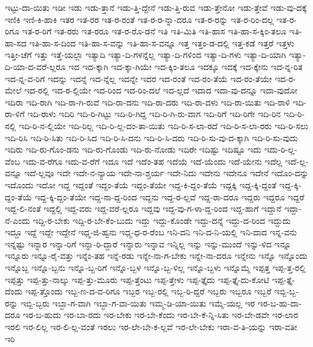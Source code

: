 {ಇಟ್ಟು-ದಾ-ಯಿತು
ಇಡೀ
ಇಡು
ಇಡು-ತ್ತಾನೆ
ಇಡು-ತ್ತಿ-ದ್ದೇನೆ
ಇಡು-ತ್ತಿ-ರುವ
ಇಡು-ತ್ತೇನೋ
ಇಡು-ತ್ತೇವೆ
ಇಡು-ವು-ದಕ್ಕೆ
ಇಣಿಕಿ
ಇಣಿ-ಕಿ-ಹಾಕಿ
ಇತರ
ಇತ-ರರ
ಇತ-ರ-ರಂತೆ
ಇತ-ರ-ರ-ನ್ನಾ-ದರೂ
ಇತ-ರ-ರನ್ನು
ಇತ-ರ-ರಿಂ-ದಲ್ಲ
ಇತ-ರ-ರಿಗೂ
ಇತ-ರ-ರಿಗೆ
ಇತ-ರರು
ಇತ-ರರೂ
ಇತ-ರ-ರೊ-ಡನೆ
ಇತಿ
ಇತಿ-ಮಿತಿ
ಇತಿ-ಹಾಸ
ಇತಿ-ಹಾ-ಸ-ಕ್ಕಿಂ-ತಲೂ
ಇತಿ-ಹಾ-ಸದ
ಇತಿ-ಹಾ-ಸ-ದಿಂದ
ಇತಿ-ಹಾ-ಸ-ವನ್ನು
ಇತಿ-ಹಾ-ಸ-ವನ್ನೂ
ಇತ್ತ
ಇತ್ತಂ-ಡ-ದಲ್ಲಿ
ಇತ್ತ-ಕಡೆ
ಇತ್ತರೆ
ಇತ್ತಳು
ಇತ್ತೀ-ಚೆಗೆ
ಇತ್ತು
ಇತ್ತೆ-ಯಲ್ಲಾ
ಇತ್ಯಾದಿ
ಇತ್ಯಾ-ದಿ-ಗಳನ್ನೆಲ್ಲ
ಇತ್ಯಾ-ದಿ-ಗಳಿಂದ
ಇತ್ಯಾ-ದಿ-ಗಳು
ಇತ್ಯಾ-ದಿ-ಯಾಗಿ
ಇತ್ಯಾ-ದಿ-ಯಾ-ದ-ವರೆ-ಲ್ಲರೂ
ಇದ
ಇದ-ಕ್ಕಾಗಿ
ಇದ-ಕ್ಕಾ-ಗಿಯೇ
ಇದ-ಕ್ಕಿಂ-ತಲೂ
ಇದಕ್ಕೂ
ಇದಕ್ಕೆ
ಇದ-ಕ್ಕೇನು
ಇದ-ನ್ನ-ರಿತ
ಇದ-ನ್ನ-ವ-ರಿಗೆ
ಇದನ್ನು
ಇದನ್ನೆ
ಇದ-ನ್ನೆಲ್ಲ
ಇದನ್ನೇ
ಇದರ
ಇದ-ರಂತೆ
ಇದ-ರಂ-ತೆಯೆ
ಇದ-ರಂ-ತೆಯೇ
ಇದ-ರ-ಮೇಲೆ
ಇದ-ರಲ್ಲಿ
ಇದ-ರ-ಲ್ಲಿಯೇ
ಇದ-ರಿಂದ
ಇದ-ರಿಂ-ದಲೆ
ಇದ-ಲ್ಲದೆ
ಇದಾದ
ಇದಾ-ವು-ದನ್ನೂ
ಇದಾ-ವುದೋ
ಇದಿರಾ
ಇದಿ-ರಾಗಿ
ಇದಿ-ರಾ-ಗಿ-ರುವೆ
ಇದಿ-ರಾ-ದನು
ಇದಿ-ರಾ-ದರು
ಇದಿ-ರಾ-ದಳು
ಇದಿ-ರಾ-ಯಿತು
ಇದಿ-ರಾಳಿ
ಇದಿ-ರಾ-ಳಿಗೆ
ಇದಿ-ರಾಳು
ಇದಿರಿ
ಇದಿ-ರಿ-ಗಿಟ್ಟು
ಇದಿ-ರಿ-ಗಿದ್ದ
ಇದಿ-ರಿ-ಗಿ-ರು-ವಾಗ
ಇದಿ-ರಿಗೆ
ಇದಿ-ರಿಗೇ
ಇದಿ-ರಿನ
ಇದಿ-ರಿ-ನಲ್ಲಿ
ಇದಿ-ರಿ-ನ-ಲ್ಲಿಯೇ
ಇದಿ-ರಿಲ್ಲ
ಇದಿ-ರಿ-ಲ್ಲ-ದಂ-ತಾ-ಯಿತು
ಇದಿ-ರಿ-ಸ-ಲಾ-ರದೆ
ಇದಿ-ರಿ-ಸ-ಲಾ-ರರು
ಇದಿ-ರಿ-ಸಲು
ಇದಿ-ರಿಸಿ
ಇದಿ-ರಿ-ಸಿತು
ಇದಿ-ರಿ-ಸಿದ
ಇದಿ-ರಿ-ಸಿ-ದನು
ಇದಿ-ರಿ-ಸಿ-ದರು
ಇದಿ-ರಿ-ಸು-ವು-ದ-ಕ್ಕಾಗಿ
ಇದಿ-ರಿ-ಸು-ವುದು
ಇದಿರು
ಇದಿ-ರು-ಗೊಂ-ಡನು
ಇದಿ-ರು-ಗೊಂಡು
ಇದಿ-ರು-ನೋಡು
ಇದಿರೇ
ಇದಿಷ್ಟು
ಇದಿಷ್ಟೂ
ಇದು
ಇದು-ರಿ-ಲ್ಲ-ವೆಂಬ
ಇದು-ವ-ರೆಗೂ
ಇದು-ವ-ರೆಗೆ
ಇದೂ
ಇದೆ
ಇದೆಂ-ತಹ
ಇದೆಯೆ
ಇದೆ-ಯೆಂದು
ಇದೆ-ಯೇನು
ಇದೆಲ್ಲ
ಇದೆ-ಲ್ಲ-ವನ್ನೂ
ಇದೆ-ಲ್ಲವೂ
ಇದೇ
ಇದೇ-ನ-ನ್ಯಾಯ
ಇದೇ-ನಾ-ಶ್ಚರ್ಯ
ಇದೇ-ನಿದು
ಇದೇನು
ಇದೇನೂ
ಇದೇನೆ
ಇದೊಂ-ದನ್ನು
ಇದೊಂದು
ಇದೋ
ಇದ್ದ
ಇದ್ದಂತೆ
ಇದ್ದಂ-ತೆಯೆ
ಇದ್ದಂ-ತೆಯೇ
ಇದ್ದ-ಕಿ-ದ್ದಂ-ತೆಯೆ
ಇದ್ದಕ್ಕಿ
ಇದ್ದ-ಕ್ಕಿ-ದ್ದಂತೆ
ಇದ್ದ-ಕ್ಕಿ-ದ್ದಂ-ತೆಯೆ
ಇದ್ದ-ಕ್ಕಿ-ದ್ದಂ-ತೆಯೇ
ಇದ್ದ-ನಾ-ದ್ದ-ರಿಂದ
ಇದ್ದನು
ಇದ್ದ-ರ-ಲ್ಲವೆ
ಇದ್ದ-ರಾ-ದರೂ
ಇದ್ದರು
ಇದ್ದರೂ
ಇದ್ದರೆ
ಇದ್ದ-ಲಿ-ನಂತೆ
ಇದ್ದಲ್ಲಿ
ಇದ್ದ-ವರು
ಇದ್ದ-ವರೆ-ಲ್ಲರೂ
ಇದ್ದವು
ಇದ್ದ-ವು-ಗ-ಳಾ-ದ್ದ-ರಿಂದ
ಇದ್ದ-ಹಾಗೆ
ಇದ್ದಾನೆ
ಇದ್ದಾ-ನೆ-ಎಂದು
ಇದ್ದಿ-ರ-ಬೇಕು
ಇದ್ದಿ-ರ-ಬೇ-ಕೆಂ-ಬುದು
ಇದ್ದು
ಇದ್ದು-ಕೊಂಡೇ
ಇದ್ದು-ದನ್ನೆ
ಇದ್ದು-ದ-ರಿಂದ
ಇದ್ದುದು
ಇದ್ದೂ
ಇದ್ದೆ
ಇದ್ದೇ
ಇದ್ದೇನೆ
ಇಧ್ಮ-ಜಿ-ಹ್ವನು
ಇಧ್ಮ-ಧ-ರ-ರೆಂಬ
ಇನಿ-ದನಿ
ಇನಿ-ದ-ನಿ-ಯಲ್ಲಿ
ಇನಿ-ದಾದ
ಇನ್ನ-ವನು
ಇನ್ನಷ್ಟು
ಇನ್ನಾರ
ಇನ್ನಾ-ರಿಗೆ
ಇನ್ನಾ-ರಿ-ದ್ದಾರೆ
ಇನ್ನಾರು
ಇನ್ನಾವ
ಇನ್ನಿಲ್ಲ
ಇನ್ನು
ಇನ್ನು-ಮುಂದೆ
ಇನ್ನು-ಳಿದ
ಇನ್ನೂ
ಇನ್ನೂರು
ಇನ್ನೂ-ರೈ-ವತ್ತು
ಇನ್ನೆಂ-ತಹ
ಇನ್ನೆ-ರಡು
ಇನ್ನೇ-ನಾ-ಗ-ಬೇಕು
ಇನ್ನೇ-ನಾ-ದರೂ
ಇನ್ನೇನು
ಇನ್ನೊ
ಇನ್ನೊಂದು
ಇನ್ನೊಬ್ಬ
ಇನ್ನೊ-ಬ್ಬನು
ಇನ್ನೊ-ಬ್ಬ-ರಿಗೆ
ಇನ್ನೊ-ಬ್ಬಳ
ಇನ್ನೊ-ಬ್ಬ-ಳಿಲ್ಲ
ಇನ್ನೊ-ಬ್ಬಳು
ಇನ್ನೊಮ್ಮೆ
ಇಪ್ಪತ್ತ
ಇಪ್ಪ-ತ್ತ-ರಲ್ಲಿ
ಇಪ್ಪತ್ತು
ಇಪ್ಪ-ತ್ತು-ನಾಲ್ಕು
ಇಪ್ಪ-ತ್ತು-ಮೂರು
ಇಪ್ಪ-ತ್ತೆಂಟು
ಇಪ್ಪ-ತ್ತೇಳು
ಇಪ್ಪ-ತ್ತೈದು
ಇಪ್ಪ-ತ್ತೈ-ದು-ಕೋಟಿ
ಇಪ್ಪ-ತ್ತೈ-ದೆಂದು
ಇಪ್ಪ-ತ್ತೊಂದು
ಇಬ್ಬ-ಣ-ದ-ವ-ರಿಗೂ
ಇಬ್ಬರ
ಇಬ್ಬ-ರಲ್ಲಿ
ಇಬ್ಬ-ರಿ-ದ್ದರೆ
ಇಬ್ಬರು
ಇಬ್ಬರೂ
ಇಬ್ಬರೆ
ಇಬ್ಬಿ-ಬ್ಬ-ರನ್ನು
ಇಬ್ಬಿ-ಬ್ಬರು
ಇಬ್ಭಾ-ಗ-ವಾಗಿ
ಇಬ್ಭಾ-ಗ-ವಾ-ಯಿತು
ಇಮ್ಮ-ಡಿ-ಯಾ-ಯಿತು
ಇಮ್ಮೆ-ಯಲ್ಲ
ಇರ
ಇರ-ಬ-ಹು-ದಾ-ದರೂ
ಇರ-ಬ-ಹುದು
ಇರ-ಬಾ-ರದು
ಇರ-ಬೇಕು
ಇರ-ಬೇ-ಕೆಂದು
ಇರ-ಬೇ-ಕೆ-ನ್ನಿ-ಸಿತು
ಇರ-ಬೇ-ಡವೇ
ಇರ-ಲಾರ
ಇರಲಿ
ಇರ-ಲಿಲ್ಲ
ಇರ-ಲಿ-ಲ್ಲ-ವಂತೆ
ಇರಲು
ಇರ-ಲೇ-ಬೇ-ಕ-ಲ್ಲವೆ
ಇರ-ಲೇ-ಬೇಕು
ಇರಾ-ವ-ತಿ-ಯನ್ನು
ಇರಾ-ವತೀ
ಇರಿ
}
